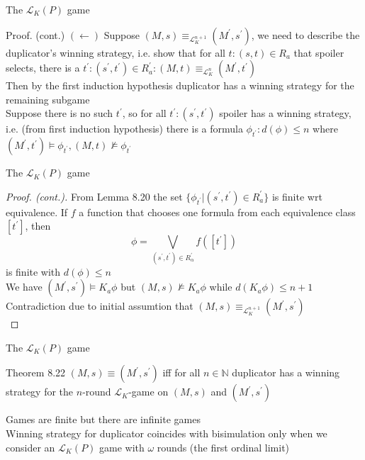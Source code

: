 \documentclass{beamer}
\newcommand{\lang}{\mathcal{L}}
\begin{document}
\begin{frame}{The $\lang_K(P)$ game}
	\begin{block}{Proof. (cont.)}
		$(\leftarrow)$ Suppose $(M,s) \equiv_{\lang_K^{n+1}} (M^\prime,s^\prime)$, we need to describe the duplicator's winning strategy, i.e. show that for all $t: (s,t) \in R_a$ that spoiler selects, there is a $t^\prime: (s^\prime,t^\prime) \in R_a^\prime: (M,t) \equiv_{\lang_K^n} (M^\prime,t^\prime)$\\
		Then by the first induction hypothesis duplicator has a winning strategy for the remaining subgame \pause
		\\[8pt]
		Suppose there is no such $t^\prime$, so for all $t^\prime: (s^\prime,t^\prime)$ spoiler has a winning strategy, i.e. (from first induction hypothesis) there is a formula $\phi_{t^\prime}: d(\phi) \leq n$ where $(M^\prime,t^\prime) \models \phi_{t^\prime}, (M,t) \not\models \phi_{t^\prime}$
	\end{block}
\end{frame}

\begin{frame}{The $\lang_K(P)$ game}
	\begin{proof}[Proof. (cont.)]
		From Lemma 8.20 the set $\{\phi_{t^\prime} | (s^\prime,t^\prime) \in R_a^\prime\}$ is finite wrt equivalence.
		If $f$ a function that chooses one formula from each equivalence class $[t^\prime]$, then
		\[ \phi = \bigvee_{(s^\prime,t^\prime)\in R_{\alpha}^\prime} f([t^\prime]) \]
		is finite with $d(\phi) \leq n$ \pause
		\\[4pt]
		We have $(M^\prime,s^\prime) \models K_a \phi$ but $(M,s) \not\models K_a \phi$ while $d(K_a \phi) \leq n+1$\\
		Contradiction due to initial assumtion that $(M,s) \equiv_{\lang_K^{n+1}} (M^\prime,s^\prime)$\\
	\end{proof}
\end{frame}

\begin{frame}{The $\lang_K(P)$ game}
	\begin{block}{Theorem 8.22}
		$(M,s) \equiv (M^\prime,s^\prime)$ iff for all $n \in \mathbb{N}$ duplicator has a winning strategy for the $n$-round $\lang_K$-game on $(M,s)$ and $(M^\prime,s^\prime)$
	\end{block} \pause
	Games are finite but there are infinite games\\ \pause
	Winning strategy for duplicator coincides with bisimulation only when we consider an $\lang_K(P)$ game with $\omega$ rounds (the first ordinal limit)
\end{frame}
\end{document}
